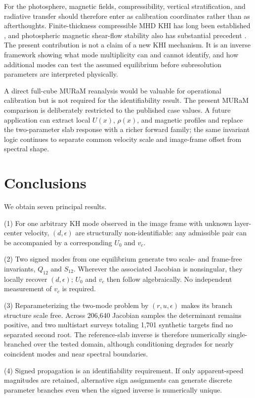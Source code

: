 \documentclass[linenumbers]{aastex7}
\begin{document}
For the photosphere, magnetic fields, compressibility, vertical stratification, and radiative transfer should therefore enter as calibration coordinates rather than as afterthoughts. Finite-thickness compressible MHD KHI has long been established \citep{MiuraPritchett1982}, and photospheric magnetic shear-flow stability also has substantial precedent \citep{Karpen1993,Kolesnikov2004}. The present contribution is not a claim of a new KHI mechanism. It is an inverse framework showing what mode multiplicity can and cannot identify, and how additional modes can test the assumed equilibrium before subresolution parameters are interpreted physically.

A direct full-cube MURaM reanalysis would be valuable for operational calibration but is not required for the identifiability result. The present MURaM comparison is deliberately restricted to the published case values. A future application can extract local $U(x)$, $\rho(x)$, and magnetic profiles and replace the two-parameter slab response with a richer forward family; the same invariant logic continues to separate common velocity scale and image-frame offset from spectral shape.

\section{Conclusions}
We obtain seven principal results.

(1) For one arbitrary KH mode observed in the image frame with unknown layer-center velocity, $(d,\epsilon)$ are structurally non-identifiable: any admissible pair can be accompanied by a corresponding $U_0$ and $v_c$.

(2) Two signed modes from one equilibrium generate two scale- and frame-free invariants, $Q_{12}$ and $S_{12}$. Wherever the associated Jacobian is nonsingular, they locally recover $(d,\epsilon)$; $U_0$ and $v_c$ then follow algebraically. No independent measurement of $v_c$ is required.

(3) Reparameterizing the two-mode problem by $(r,u,\epsilon)$ makes its branch structure scale free. Across 206,640 Jacobian samples the determinant remains positive, and two multistart surveys totaling 1,701 synthetic targets find no separated second root. The reference-slab inverse is therefore numerically single-branched over the tested domain, although conditioning degrades for nearly coincident modes and near spectral boundaries.

(4) Signed propagation is an identifiability requirement. If only apparent-speed magnitudes are retained, alternative sign assignments can generate discrete parameter branches even when the signed inverse is numerically unique.
\end{document}

